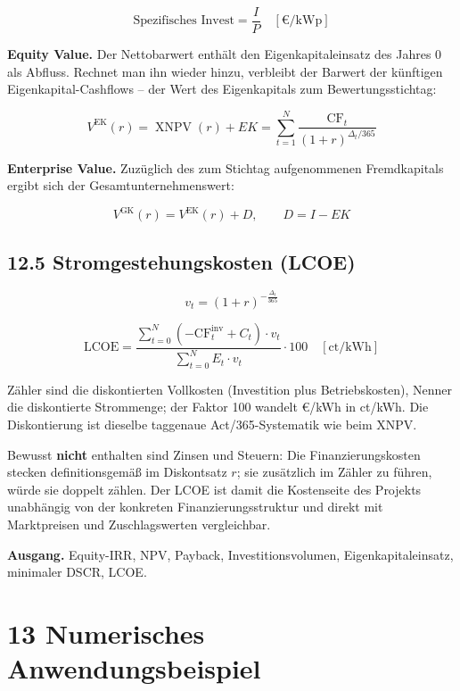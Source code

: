 \documentclass[
  a4paper,
  10pt]{article}
\begin{document}
\[ \text{Spezifisches Invest} = \frac{I}{P} \quad \left[\text{€/kWp}\right] \]

\textbf{Equity Value.} Der Nettobarwert enthält den Eigenkapitaleinsatz
des Jahres 0 als Abfluss. Rechnet man ihn wieder hinzu, verbleibt der
Barwert der künftigen Eigenkapital-Cashflows -- der Wert des
Eigenkapitals zum Bewertungsstichtag:

\[ V^{\mathrm{EK}}(r) = \operatorname{XNPV}(r) + EK = \sum_{t=1}^{N} \frac{\mathrm{CF}_t}{(1+r)^{\Delta_t/365}} \]

\textbf{Enterprise Value.} Zuzüglich des zum Stichtag aufgenommenen
Fremdkapitals ergibt sich der Gesamtunternehmenswert:

\[ V^{\mathrm{GK}}(r) = V^{\mathrm{EK}}(r) + D, \qquad D = I - EK \]

\hypertarget{stromgestehungskosten-lcoe}{%
\subsection{12.5 Stromgestehungskosten
(LCOE)}\label{stromgestehungskosten-lcoe}}

\[ v_t = (1 + r)^{-\frac{\Delta_t}{365}} \]

\[ \mathrm{LCOE} = \frac{\sum_{t=0}^{N} \left(-\mathrm{CF}^{\mathrm{inv}}_t + C_t\right) \cdot v_t}{\sum_{t=0}^{N} E_t \cdot v_t} \cdot 100 \quad \left[\text{ct/kWh}\right] \]

Zähler sind die diskontierten Vollkosten (Investition plus
Betriebskosten), Nenner die diskontierte Strommenge; der Faktor 100
wandelt €/kWh in ct/kWh. Die Diskontierung ist dieselbe taggenaue
Act/365-Systematik wie beim XNPV.

Bewusst \textbf{nicht} enthalten sind Zinsen und Steuern: Die
Finanzierungskosten stecken definitionsgemäß im Diskontsatz \(r\); sie
zusätzlich im Zähler zu führen, würde sie doppelt zählen. Der LCOE ist
damit die Kostenseite des Projekts unabhängig von der konkreten
Finanzierungsstruktur und direkt mit Marktpreisen und Zuschlagswerten
vergleichbar.

\textbf{Ausgang.} Equity-IRR, NPV, Payback, Investitionsvolumen,
Eigenkapitaleinsatz, minimaler DSCR, LCOE.

\hypertarget{numerisches-anwendungsbeispiel}{%
\section{13 Numerisches
Anwendungsbeispiel}\label{numerisches-anwendungsbeispiel}}
\end{document}
